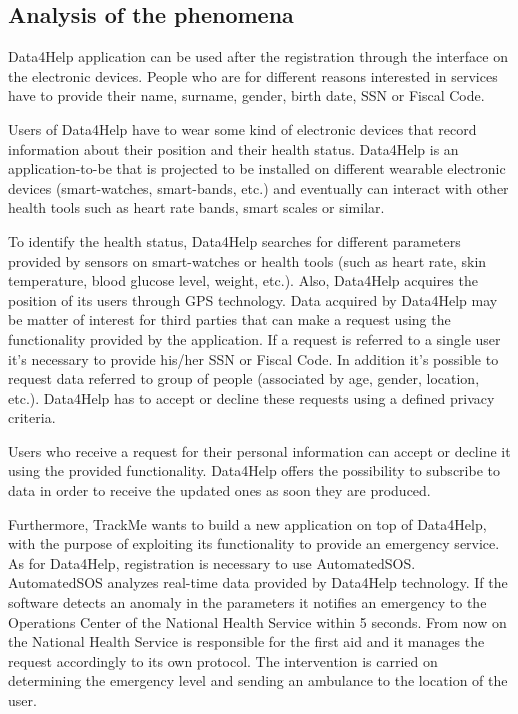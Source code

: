 \subsection{Analysis of the phenomena}
Data4Help application can be used after the registration through the interface on the electronic devices.
People who are for different reasons interested in services have to provide their name, surname, gender, birth date, SSN or Fiscal Code.
\par Users of Data4Help have to wear some kind of electronic devices that record information about their position and their health status.
Data4Help is an application-to-be that is projected to be installed on different wearable electronic devices (smart-watches, smart-bands, etc.) and eventually can interact with other health tools such as heart rate bands, smart scales or similar.
\par To identify the health status, Data4Help searches for different parameters provided by sensors on smart-watches or health tools (such as heart rate, skin temperature, blood glucose level, weight, etc.).
Also, Data4Help acquires the position of its users through GPS technology.
\newline Data acquired by Data4Help may be matter of interest for third parties that can make a request using the functionality provided by the application. If a request is referred to a single user it's necessary to provide his/her SSN or Fiscal Code. In addition it's possible to request data referred to group of people (associated by age, gender, location, etc.). Data4Help has to accept or decline these requests using a defined privacy criteria.
\par Users who receive a request for their personal information can accept or decline it using the provided functionality.
\newline Data4Help offers the possibility to subscribe to data in order to receive the updated ones as soon they are produced.
\par Furthermore, TrackMe wants to build a new application on top of Data4Help, with the purpose of exploiting its functionality to provide an emergency service.
As for Data4Help, registration is necessary to use AutomatedSOS.
\newline AutomatedSOS analyzes real-time data provided by Data4Help technology.
If the software detects an anomaly in the parameters it notifies an emergency to the Operations Center of the National Health Service within 5 seconds. 
From now on the National Health Service is responsible for the first aid and it manages the request accordingly to its own protocol.
The intervention is carried on determining the emergency level and sending an ambulance to the location of the user.

